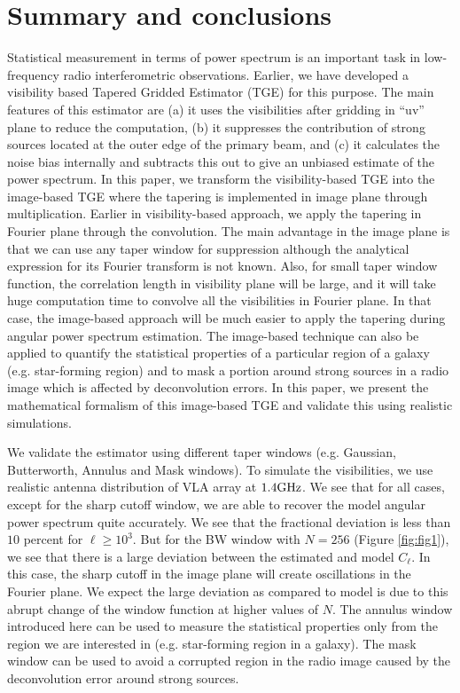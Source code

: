 \documentclass{article}
\begin{document}
\section{Summary and conclusions}
\label{summ}
Statistical measurement in terms of power spectrum is an important
task in low-frequency radio interferometric observations. Earlier, we
have developed a visibility based Tapered Gridded Estimator (TGE) for
this purpose. The main features of this estimator are (a) it uses the
visibilities after gridding in ``uv'' plane to reduce the computation,
(b) it suppresses the contribution of strong sources located at the
outer edge of the primary beam, and (c) it calculates the noise bias
internally and subtracts this out to give an unbiased estimate of the
power spectrum. In this paper, we transform the visibility-based TGE
into the image-based TGE where the tapering is implemented in image
plane through multiplication. Earlier in visibility-based approach, we
apply the tapering in Fourier plane through the convolution. The main
advantage in the image plane is that we can use any taper window for
suppression although the analytical expression for its Fourier
transform is not known. Also, for small taper window function, the
correlation length in visibility plane will be large, and it will take
huge computation time to convolve all the visibilities in Fourier
plane. In that case, the image-based approach will be much easier to
apply the tapering during angular power spectrum estimation. The
image-based technique can also be applied to quantify the statistical
properties of a particular region of a galaxy (e.g. star-forming
region) and to mask a portion around strong sources in a radio image
which is affected by deconvolution errors. In this paper, we present
the mathematical formalism of this image-based TGE and validate this
using realistic simulations.

We validate the estimator using different taper windows
(e.g. Gaussian, Butterworth, Annulus and Mask windows). To simulate
the visibilities, we use realistic antenna distribution of VLA array
at $1.4{\rm GHz}$. We see that for all cases, except for the sharp
cutoff window, we are able to recover the model angular power spectrum
quite accurately. We see that the fractional deviation is less than
$10$ percent for $\ell\ge10^3$. But for the BW window with $N=256$
(Figure \ref {fig:fig1}), we see that there is a large deviation
between the estimated and model $C_{\ell}$. In this case, the sharp
cutoff in the image plane will create oscillations in the Fourier
plane. We expect the large deviation as compared to model is due to
this abrupt change of the window function at higher values of $N$. The
annulus window introduced here can be used to measure the statistical
properties only from the region we are interested in
(e.g. star-forming region in a galaxy). The mask window can be used to
avoid a corrupted region in the radio image caused by the
deconvolution error around strong sources.
\end{document}
